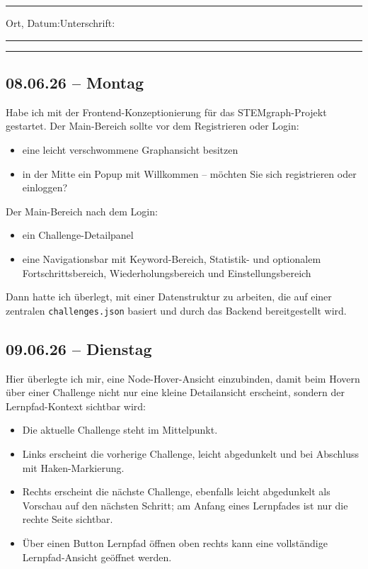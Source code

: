 \vfill
\noindent\rule{\linewidth}{0.2pt}

\noindent Ort, Datum:\hfill Unterschrift:\\[0.5cm]
\noindent \rule{6cm}{0.9pt}\hfill \rule{6cm}{0.9pt}

\restoregeometry
\newpage


{\small
\vspace*{-2cm}

\subsection{08.06.26 -- Montag}

Habe ich mit der Frontend-Konzeptionierung für das STEMgraph-Projekt gestartet.
Der Main-Bereich sollte vor dem Registrieren oder Login:

\begin{itemize}
  \item eine leicht verschwommene Graphansicht besitzen
  \item in der Mitte ein Popup mit \glqq Willkommen -- möchten Sie sich registrieren
        oder einloggen?\grqq{}
\end{itemize}

Der Main-Bereich nach dem Login:

\begin{itemize}
  \item ein Challenge-Detailpanel
  \item eine Navigationsbar mit Keyword-Bereich, Statistik- und optionalem
        Fortschrittsbereich, Wiederholungsbereich und Einstellungsbereich
\end{itemize}

Dann hatte ich überlegt, mit einer Datenstruktur zu arbeiten, die auf einer zentralen
\texttt{challenges.json} basiert und durch das Backend bereitgestellt wird.

\subsection{09.06.26 -- Dienstag}

Hier überlegte ich mir, eine Node-Hover-Ansicht einzubinden, damit beim Hovern über
einer Challenge nicht nur eine kleine Detailansicht erscheint, sondern der
Lernpfad-Kontext sichtbar wird:

\begin{itemize}
  \item Die aktuelle Challenge steht im Mittelpunkt.
  \item Links erscheint die vorherige Challenge, leicht abgedunkelt und bei
        Abschluss mit Haken-Markierung.
  \item Rechts erscheint die nächste Challenge, ebenfalls leicht abgedunkelt
        als Vorschau auf den nächsten Schritt; am Anfang eines Lernpfades ist
        nur die rechte Seite sichtbar.
  \item Über einen Button \glqq Lernpfad öffnen\grqq{} oben rechts kann eine
        vollständige Lernpfad-Ansicht geöffnet werden.
\end{itemize}

}
